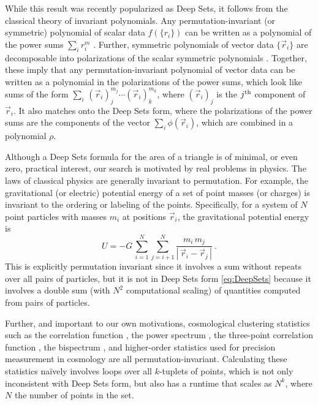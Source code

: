 \documentclass[10pt]{article}
\newcommand{\abs}[1]{|\,{#1}\,|}
\begin{document}
While this result was recently popularized as Deep Sets, it follows from the classical theory of invariant polynomials.
Any permutation-invariant (or symmetric) polynomial of scalar data $f(\{r_i\})$ can be written as a polynomial of the power sums $\sum_i r_i^m$ \citep{Waring1782}.
Further, symmetric polynomials of vector data $\{ \vec{r}_i \}$ are decomposable into polarizations of the scalar symmetric polynomials \citep{Weyl1939}.
Together, these imply that any permutation-invariant polynomial of vector data can be written as a polynomial in the polarizations of the power sums, which look like sums of the form $\sum_i \, (\vec{r}_{i})_{j}^{m_j} \cdots (\vec{r}_{i})_{k}^{m_k}$, where $(\vec{r}_i)_j$ is the $j^{\rm th}$ component of $\vec{r}_i$.
It also matches onto the Deep Sets form, where the polarizations of the power sums are the components of the vector $\sum_i \phi(\vec{r}_i)$, which are combined in a polynomial $\rho$.

Although a Deep Sets formula for the area of a triangle is of minimal, or even zero, practical interest, our search is motivated by real problems in physics.
The laws of classical physics are generally invariant to permutation.
For example, the gravitational (or electric) potential energy of a set of point masses (or charges) is invariant to the ordering or labeling of the points. 
Specifically, for a system of $N$ point particles with masses $m_i$ at positions $\vec{r}_i$, the gravitational potential energy is
\begin{equation}
\label{eq:EnergyNaive}
    U = -G \, \sum_{i=1}^{N} \sum_{j=i+1}^{N} \frac{m_i \, m_j}{\abs{\vec{r}_i - \vec{r}_j}} ~.
\end{equation}
This is explicitly permutation invariant since it involves a sum without repeats over all pairs of particles, but it is not in Deep Sets form \eqref{eq:DeepSets} because it involves a double sum (with $N^2$ computational scaling) of quantities computed from pairs of particles.

Further, and important to our own motivations, cosmological clustering statistics such as 
the correlation function \citep{Peebles1973},
the power spectrum \citep{Peebles1973},
the three-point correlation function \citep{PeeblesGroth1975},
the bispectrum \citep{FrySeldner1982},
and higher-order statistics \citep{Peebles1980book}
used for precision measurement in cosmology \citep[e.g.,][]{Eisenstein+2005BAO,Planck18PNG,Planck18Inflation,Cabass+2022}
are all permutation-invariant.
Calculating these statistics na\"ively involves loops over all $k$-tuplets of points, which is not only inconsistent with Deep Sets form, but also has a runtime that scales as $N^k$, where $N$ the number of points in the set.
\end{document}
